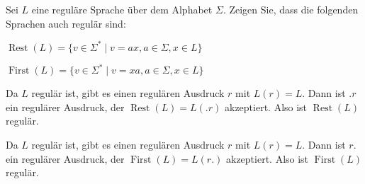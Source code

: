 Sei $L$ eine reguläre Sprache über dem Alphabet $\Sigma$.
Zeigen Sie, dass die folgenden Sprachen auch regulär sind:
\begin{teilaufgaben}
\item $\operatorname{Rest}(L)=\{v \in\Sigma^*\mid v=ax, a\in\Sigma, x\in L\}$
\item $\operatorname{First}(L)=\{v \in\Sigma^*\mid v=xa, a\in\Sigma, x\in L\}$
\end{teilaufgaben}


\begin{loesung}
\begin{teilaufgaben}
\item Da $L$ regulär ist, gibt es einen regulären Ausdruck $r$ mit
$L(r)=L$. Dann ist $.r$ ein regulärer Ausdruck, der
$\operatorname{Rest}(L)=L(.r)$ akzeptiert.
Also ist
$\operatorname{Rest}(L)$ regulär.
\item Da $L$ regulär ist, gibt es einen regulären Ausdruck $r$ mit
$L(r)=L$. Dann ist $r.$ ein regulärer Ausdruck, der
$\operatorname{First}(L)=L(r.)$ akzeptiert. Also ist
$\operatorname{First}(L)$ regulär.
\qedhere
\end{teilaufgaben}
\end{loesung}

